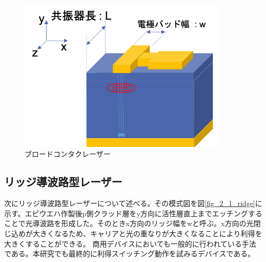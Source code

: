 \begin{figure}[t]
	\centering
	\includegraphics[width=10cm]{figure/fig_2_1_broadcontact.png}
	\caption{ブロードコンタクレーザー}
	\label{fig:sample_broadcontact}
\end{figure}

\subsection{リッジ導波路型レーザー}%
次にリッジ導波路型レーザーについて述べる。その模式図を図\ref{fig_2_1_ridge}に示す。エピウエハ作製後p側クラッド層をy方向に活性層直上までエッチングすることで光導波路を形成した。そのときx方向のリッジ幅をwと呼ぶ。x方向の光閉じ込めが大きくなるため、キャリアと光の重なりが大きくなることにより利得を大きくすることができる。%
商用デバイスにおいても一般的に行われている手法である。本研究でも最終的に利得スイッチング動作を試みるデバイスである。


